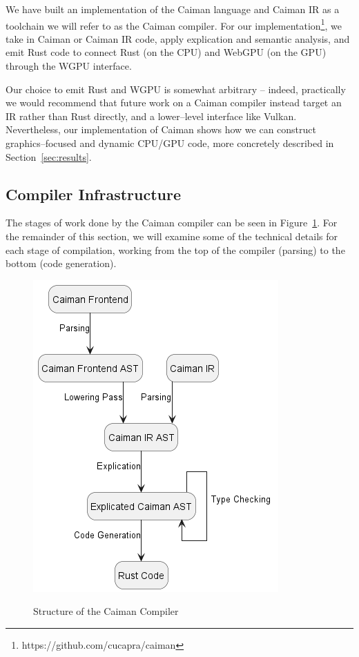 We have built an implementation of the Caiman language and Caiman IR as a toolchain we will refer to as the Caiman compiler.  For our implementation\footnote{https://github.com/cucapra/caiman}, we take in Caiman or Caiman IR code, apply explication and semantic analysis, and emit Rust code to connect Rust (on the CPU) and WebGPU (on the GPU) through the WGPU interface.

Our choice to emit Rust and WGPU is somewhat arbitrary -- indeed, practically we would recommend that future work on a Caiman compiler instead target an IR rather than Rust directly, and a lower--level interface like Vulkan.  Nevertheless, our implementation of Caiman shows how we can construct graphics--focused and dynamic CPU/GPU code, more concretely described in Section~\ref{sec:results}.

\subsection{Compiler Infrastructure}
\label{subsec:compilation}

The stages of work done by the Caiman compiler can be seen in Figure~\ref{fig:caiman-compiler}.  For the remainder of this section, we will examine some of the technical details for each stage of compilation, working from the top of the compiler (parsing) to the bottom (code generation).

\begin{figure}
\includegraphics[width=.7\linewidth]{fig/caimanengineering.png}
\label{fig:caiman-compiler}
\caption{Structure of the Caiman Compiler}
\end{figure}

